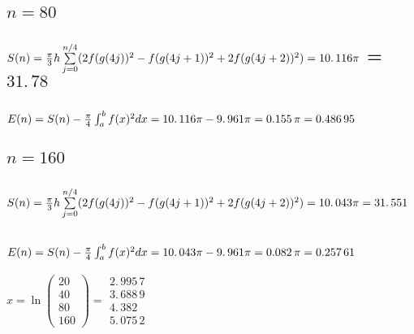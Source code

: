 \documentclass{article}
\begin{document}
\bigskip

\subsection{$n=80$}

\subsection{$S(n)=\frac{\protect\pi }{3}h\sum%
\limits_{j=0}^{n/4}(2f(g(4j))^{2}-f(g(4j+1))^{2}+2f(g(4j+2))^{2})=%
\allowbreak 10.\,\allowbreak 116\protect\pi $ = $31.\,\allowbreak 78$}

\subsection{$E(n)=S(n)-\frac{\protect\pi }{4}\protect\int_{a}^{b}f(x)^{2}dx=%
\allowbreak \allowbreak 10.\,\allowbreak 116\protect\pi -\allowbreak
9.\,\allowbreak 961\protect\pi =\allowbreak 0.155\,\protect\pi =\allowbreak
0.486\,95$}

\bigskip

\subsection{$n=160$}

\subsection{$S(n)=\frac{\protect\pi }{3}h\sum%
\limits_{j=0}^{n/4}(2f(g(4j))^{2}-f(g(4j+1))^{2}+2f(g(4j+2))^{2})=%
\allowbreak 10.\,\allowbreak 043\protect\pi =\allowbreak 31.\,\allowbreak
551 $}

\subsection{$E(n)=S(n)-\frac{\protect\pi }{4}\protect\int_{a}^{b}f(x)^{2}dx=%
\allowbreak \allowbreak \allowbreak 10.\,\allowbreak 043\protect\pi %
-\allowbreak 9.\,\allowbreak 961\protect\pi =\allowbreak 0.082\,\protect\pi %
=\allowbreak 0.257\,61$}

\bigskip $x=\ln (%
\begin{array}{c}
20 \\ 
40 \\ 
80 \\ 
160%
\end{array}%
)=\allowbreak 
\begin{array}{c}
2.\,\allowbreak 995\,7 \\ 
3.\,\allowbreak 688\,9 \\ 
4.\,\allowbreak 382 \\ 
5.\,\allowbreak 075\,2%
\end{array}%
\allowbreak $
\end{document}
